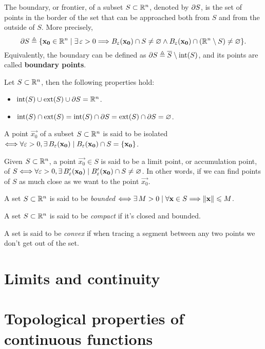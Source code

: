 \begin{defn}[Boundary]
	The boundary, or frontier, of a subset $S\subset\Rtn$, denoted by $\partial S$, is the set of points in the border of the
	set that can be approached both from $S$ and from the outside of $S$. More precisely, 
	\begin{equation}
		\frontier{S}\bydef\{\vec{x_0}\in\Rtn\st\exists\epsilon > 0\implies B_\epsilon
		\argopen(\vec{x_0}\argclose)\cap S\neq\O\land B_\epsilon\argopen(\vec{x_0}\argclose)\cap\left(\Rtn\setminus S\right)
		\neq\O\}.
	\end{equation}
	Equivalently, the boundary can be defined as $\frontier{S}\bydef\closure{S}\setminus\interior{S}$, and its points are called
	\textbf{boundary points}.
\end{defn}

\begin{prop}
	Let $S\subset\Rtn$, then the following properties hold:
	\begin{itemize}[itemsep = -2pt]
		\item $\interior{S}\cup\exterior{S}\cup\frontier{S} = \Rtn$.
		\item $\interior{S}\cap\exterior{S} = \interior{S}\cap\frontier{S} = \exterior{S}\cap\frontier{S} = \O$.
	\end{itemize}
\end{prop}

\begin{defn}
A point $\vec{x_0}$ of a subset $S\subset\Rtn$ is said to be isolated $\iff\forall\epsilon > 0, \exists B_\epsilon\argopen(\vec{x_0}
	\argclose)\st B_\epsilon\argopen(\vec{x_0}\argclose)\cap S = \{\vec{x_0}\}$.
\end{defn}

\begin{defn}
Given $S\subset\Rtn$, a point $\vec{x_0}\in S$ is said to be a limit point, or accumulation point, of $S\iff\forall\epsilon > 0, 
	\exists B'_\epsilon\argopen(\vec{x_0}\argclose)\st B'_\epsilon\argopen(\vec{x_0}\argclose)\cap S\neq\O$. In other words, 
	if we can find points of $S$ as much close as we want to the point $\vec{x_0}$.
\end{defn}

\begin{defn}
A set $S\subset\Rtn$ is said to be \textit{bounded} $\iff\exists M > 0\st\forall\vec{x}\in S\implies \vnorm{\vec{x}}\leq M$.
\end{defn}

\begin{defn}
A set $S\subset\Rtn$ is said to be \textit{compact} if it's closed and bounded.
\end{defn}

\begin{defn}
A set is said to be \textit{convex} if when tracing a segment between any two points we don't get out of the set.
\end{defn}


\section{Limits and continuity}
\section{Topological properties of continuous functions}
